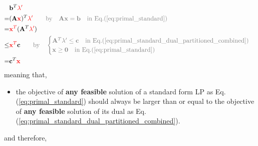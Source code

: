 \documentclass[twocolumn]{ctexart}
\begin{document}
\begin{equation}
    \begin{aligned}
        \label{eq:weak_duality_lemma}
        &
        \mathbf{b}^T
        {\color{red} \mathbf{\lambda}'}
        \\=&
        (
            \mathbf{A}
            {\color{red} \mathbf{x}}
        )^T
        {\color{red} \mathbf{\lambda}'}
        \qquad {\color{gray} \text{by} \quad
            \mathbf{A}  \mathbf{x}  =  \mathbf{b}  \quad \text{in Eq.(\ref{eq:primal_standard})}
        }
        \\=&
        {\color{red} \mathbf{x}^T}
        (
            \mathbf{A}^T
            {\color{red} \mathbf{\lambda}'}
        )
        \\ \leq &
        {\color{red} \mathbf{x}^T}
        \mathbf{c}
        \qquad {\color{gray} \text{by} \quad
            \begin{cases}
                \mathbf{A}^T  \mathbf{\lambda}'  \leq  \mathbf{c}  \quad \text{in Eq.(\ref{eq:primal_standard_dual_partitioned_combined})}
                \\
                \mathbf{x} \geq \mathbf{0}                         \quad \text{in Eq.(\ref{eq:primal_standard})}
            \end{cases}
        }
        \\=&
        \mathbf{c}^T
        {\color{red} \mathbf{x}}
    \end{aligned}
\end{equation}
meaning that,
\begin{itemize}
    \item
    the objective of \textbf{any feasible} solution of a standard form LP as Eq.(\ref{eq:primal_standard})
    should always be larger than or equal to
    the objective of \textbf{any feasible} solution of its dual as Eq.(\ref{eq:primal_standard_dual_partitioned_combined}).
\end{itemize}
and therefore,
\end{document}
